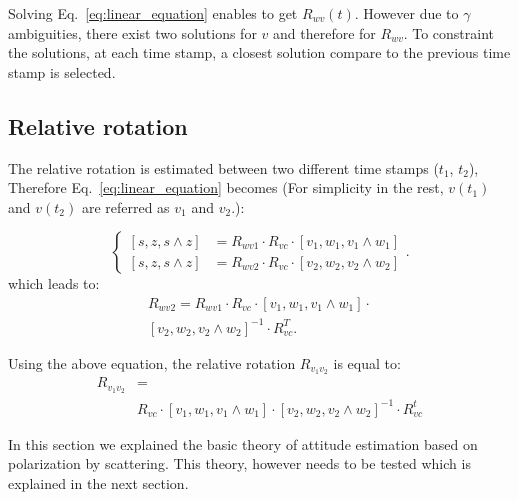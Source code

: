 Solving Eq.~\ref{eq:linear_equation} enables to get $R_{wv}(t)$. However due to
$\gamma$ ambiguities, there exist two solutions for $v$ and therefore for
$R_{wv}$.
To constraint the solutions, at each time stamp, a closest solution compare to
the previous time stamp is selected.



\subsection{Relative rotation}
\label{sec:rel-rot}

The relative rotation is estimated between two different time stamps ($t_1$,
$t_2$), Therefore Eq.~\ref{eq:linear_equation} becomes (For simplicity in the
rest, $v(t_1)$ and $v(t_2)$ are referred as $v_1$ and $v_2$.):

\begin{equation}
\begin{cases}
\left[s,z,s\wedge z\right] & =R_{wv1}\cdot R_{vc}\cdot\left[v_{1},w_{1},v_{1}\wedge w_{1}\right]\\
\left[s,z,s\wedge z\right] & =R_{wv2}\cdot R_{vc}\cdot\left[v_{2},w_{2},v_{2}\wedge w_{2}\right]
\end{cases}.
\label{eq:rel-linear_equation}
\end{equation}
\noindent which leads to:
\begin{equation}
  \begin{split}
R_{wv2}=R_{wv1}\cdot R_{vc}\cdot\left[v_{1},w_{1},v_{1}\wedge
  w_{1}\right]\cdot \\
\left[v_{2},w_{2},v_{2}\wedge w_{2}\right]^{-1} \cdot R_{vc}^{T}.
\label{eq:relative_equation}\end{split}
\end{equation}

Using the above equation, the relative rotation $R_{v_{1}v_{2}}$ is equal to:
\begin{equation}
\begin{split}
  R_{v_{1}v_{2}} &= \\
   & R_{vc}\cdot\left[v_{1},w_{1},v_{1}\wedge
  w_{1}\right]\cdot\left[v_{2},w_{2},v_{2}\wedge w_{2}\right]^{-1}\cdot
R_{vc}^{t}
\end{split}
\label{eq:final-relative}
\end{equation}


In this section we explained the basic theory of attitude estimation based on
polarization by scattering.
This theory, however needs to be tested which is explained in the next section.





